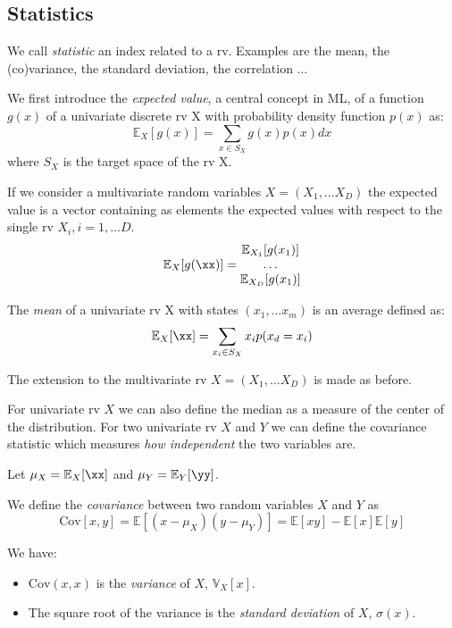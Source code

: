  \subsection{Statistics}

 We call \textit{statistic} an   index related to a rv. Examples are the mean, the (co)variance, the standard deviation, the correlation ...

 We first introduce the \textit{expected value}, a central concept in ML, of a function $g(x)$ of a univariate discrete rv X with probability density function $p(x)$ as:
   $$\mathbb{E}_X[g(x)]=\sum_{x \in S_X} g(x)p(x)dx$$
   where $S_X$ is the target space of the rv X.
  
   If we consider a multivariate random variables $X=(X_1, \ldots X_D)$ the expected value is a vector containing as elements the expected values with respect to the single rv $X_i, i=1, \ldots D$.
   $$ \mathbb{E}_X[g(\xx)]=\begin{matrix} 
   \mathbb{E}_{X_1}[g(x_1)] \\
   \ldots \\
   \mathbb{E}_{X_D}[g(x_1)] 
   \end{matrix}
   $$
  

   \begin{definition} 
   The \textit{mean} of a univariate rv X with states $(x_1, \ldots x_m)$ is an average defined as:   $$\mathbb{E}_X[\xx]=\sum_{x_i \in S_X}x_i p(x_d=x_i)$$
   \end{definition}
   
The extension to the multivariate rv $X=(X_1, \ldots X_D)$ is made as before.
   
For univariate rv $X$ we can also define the median as a measure of the center of the distribution.
 For two univariate rv $X$ and $Y$ we can define the covariance statistic which measures \textit{how independent} the two variables are. 
  
  
   Let $\mu_X=\mathbb{E}_X[\xx]$ and $\mu_Y=\mathbb{E}_Y[\yy]$.
 \begin{definition}
     We define the \textit{covariance} between two random variables $X$ and $Y$ as
     $$ \text{Cov}[x, y] = \mathbb{E}[(x - \mu_X)(y - \mu_Y)] = \mathbb{E}[xy] - \mathbb{E}[x]\mathbb{E}[y] $$
 \end{definition}

 We have:
 \begin{itemize}
\item $\text{Cov}(x, x)$ is  the \textit{variance} of $X$, $\mathbb{V}_X[x]$.
\item The square root of the variance is the \textit{standard deviation} of $X$, $\sigma(x)$.
 \end{itemize}
 
